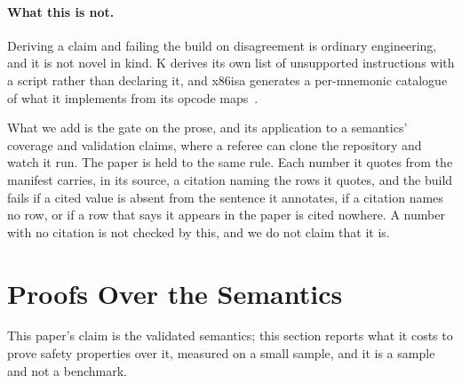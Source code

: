\documentclass[runningheads]{llncs}
\newcommand{\src}[1]{}  %
\begin{document}
\paragraph{What this is not.}
Deriving a claim and failing the build on disagreement is ordinary engineering, and it is not novel in
kind. K derives its own list of unsupported instructions with a script rather than declaring it, and x86isa
generates a per-mnemonic catalogue of what it implements from its opcode maps~\cite{x86isa-catalogue}.
\src{docs/TACAS-G6-RELATED-WORK.md 2: scripts/find\_unsupported\_insttructions.pl; x86isa machine/catalogue-doc.lisp (defxdoc implemented-instructions) and catalogue-data.lisp at acl2 c8897a34}
What we add is the gate on the prose, and its application to a semantics' coverage and validation
claims, where a referee can clone the repository and watch it run.
The paper is held to the same rule. Each number it quotes from the manifest carries, in its source,
a citation naming the rows it quotes, and the build fails if a cited value is absent from the sentence
it annotates, if a citation names no row, or if a row that says it appears in the paper is cited
nowhere. A number with no citation is not checked by this, and we do not claim that it is.
\src{scripts/check\_claims.py check\_prose and its selftest arms; docs/DECISIONS.md D216}

\section{Proofs Over the Semantics}
\label{sec:proofs}

This paper's claim is the validated semantics; this section reports what it costs to prove safety
properties over it, measured on a small sample, and it is a sample and not a benchmark.
\end{document}
